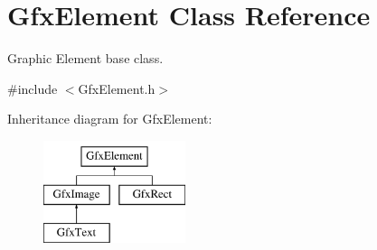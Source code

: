 \hypertarget{classGfxElement}{\section{Gfx\-Element Class Reference}
\label{classGfxElement}
}


Graphic Element base class.  




{\ttfamily \#include $<$Gfx\-Element.\-h$>$}

Inheritance diagram for Gfx\-Element\-:\begin{figure}[H]
\begin{center}
\leavevmode
\includegraphics[height=3.000000cm]{classGfxElement}
\end{center}
\end{figure}
